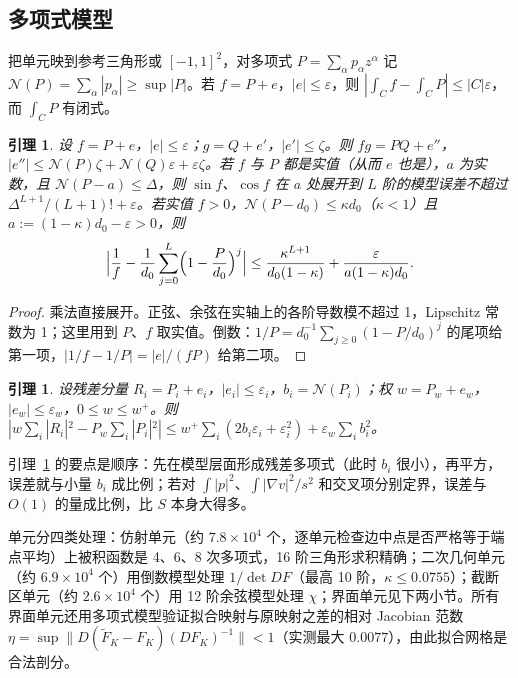 \documentclass[11pt,a4paper,fontset=fandol]{ctexart}
\theoremstyle{plain}
\newtheorem{lemma}[theorem]{引理}
\theoremstyle{definition}
\theoremstyle{remark}
\begin{document}
\subsection{多项式模型}

把单元映到参考三角形或 $[-1,1]^2$，对多项式 $P=\sum_\alpha p_\alpha z^\alpha$ 记 $\mathcal N(P)=\sum_\alpha|p_\alpha|\ge\sup|P|$。若 $f=P+e$，$|e|\le\varepsilon$，则 $|\int_Cf-\int_CP|\le|C|\varepsilon$，而 $\int_CP$ 有闭式。

\begin{lemma}
\label{lem:model-arith}
设 $f=P+e$，$|e|\le\varepsilon$；$g=Q+e'$，$|e'|\le\zeta$。则 $fg=PQ+e''$，$|e''|\le\mathcal N(P)\zeta+\mathcal N(Q)\varepsilon+\varepsilon\zeta$。若 $f$ 与 $P$ 都是实值（从而 $e$ 也是），$a$ 为实数，且 $\mathcal N(P-a)\le\Delta$，则 $\sin f$、$\cos f$ 在 $a$ 处展开到 $L$ 阶的模型误差不超过 $\Delta^{L+1}/(L+1)!+\varepsilon$。若实值 $f>0$，$\mathcal N(P-d_0)\le\kappa d_0$（$\kappa<1$）且 $a:=(1-\kappa)d_0-\varepsilon>0$，则
\[
\Bigl|\frac1f-\frac1{d_0}\sum_{j=0}^L\Bigl(1-\frac P{d_0}\Bigr)^j\Bigr|\le\frac{\kappa^{L+1}}{d_0(1-\kappa)}+\frac{\varepsilon}{a(1-\kappa)d_0}.
\]
\end{lemma}

\begin{proof}
乘法直接展开。正弦、余弦在实轴上的各阶导数模不超过 1，Lipschitz 常数为 1；这里用到 $P$、$f$ 取实值。倒数：$1/P=d_0^{-1}\sum_{j\ge0}(1-P/d_0)^j$ 的尾项给第一项，$|1/f-1/P|=|e|/(fP)$ 给第二项。
\end{proof}

\begin{lemma}
\label{lem:square-last}
设残差分量 $R_i=P_i+e_i$，$|e_i|\le\varepsilon_i$，$b_i=\mathcal N(P_i)$；权 $w=P_w+e_w$，$|e_w|\le\varepsilon_w$，$0\le w\le w^+$。则 $|w\sum_i|R_i|^2-P_w\sum_i|P_i|^2|\le w^+\sum_i(2b_i\varepsilon_i+\varepsilon_i^2)+\varepsilon_w\sum_ib_i^2$。
\end{lemma}

引理~\ref{lem:square-last} 的要点是顺序：先在模型层面形成残差多项式（此时 $b_i$ 很小），再平方，误差就与小量 $b_i$ 成比例；若对 $\int|p|^2$、$\int|\nabla v|^2/s^2$ 和交叉项分别定界，误差与 $O(1)$ 的量成比例，比 $S$ 本身大得多。

单元分四类处理：仿射单元（约 $7.8\times10^4$ 个，逐单元检查边中点是否严格等于端点平均）上被积函数是 4、6、8 次多项式，16 阶三角形求积精确；二次几何单元（约 $6.9\times10^4$ 个）用倒数模型处理 $1/\det DF$（最高 10 阶，$\kappa\le0.0755$）；截断区单元（约 $2.6\times10^4$ 个）用 12 阶余弦模型处理 $\chi$；界面单元见下两小节。所有界面单元还用多项式模型验证拟合映射与原映射之差的相对 Jacobian 范数 $\eta=\sup\|D(\widetilde F_K-F_K)(DF_K)^{-1}\|<1$（实测最大 $0.0077$），由此拟合网格是合法剖分。
\end{document}
